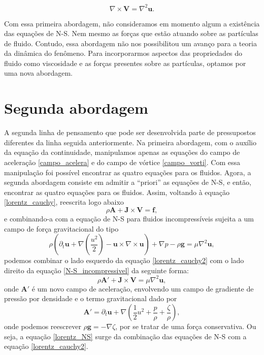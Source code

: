 \begin{equation}\label{amper-max_fluido2}
\nabla\times\textbf{V} = \nabla^{2}\textbf{u}.
\end{equation}

Com essa primeira abordagem, não consideramos em momento algum a existência das equações de N-S. Nem mesmo as forças que estão atuando sobre as partículas de fluido. Contudo, essa abordagem não nos possibilitou um avanço para a teoria da dinâmica do fenômeno. Para incorporarmos aspectos das propriedades do fluido como viscosidade e as forças presentes sobre as partículas, optamos por uma nova abordagem. 

\section{Segunda abordagem}
A segunda linha de pensamento que pode ser desenvolvida parte de pressupostos diferentes da linha seguida anteriormente. Na primeira abordagem, com o auxílio da equação da continuidade, manipulamos apenas as equações do campo de aceleração \ref{campo_acelera} e do campo de vórtice \ref{campo_vorti}. Com essa manipulação foi possível encontrar as quatro equações para os fluidos. Agora, a segunda abordagem consiste em admitir a “priori” as equações de N-S, e então, encontrar as quatro equações para os fluidos. Assim, voltando à equação \ref{lorentz_cauchy}, reescrita logo abaixo
\begin{equation}\label{lorentz_cauchy2}
    \rho \textbf{A} + \textbf{J} \times \textbf{V}= \textbf{f},
\end{equation}
e combinando-a com a equação de N-S para fluidos incompressíveis sujeita a um campo de força gravitacional do tipo
\begin{equation}\label{N-S_incompressivel}
    \rho \left(\partial_t\textbf{u} + \nabla(\frac{u^2}{2}) - \textbf{u}\times\nabla\times\textbf{u}\right) + \nabla p - \rho\textbf{g} = \mu\nabla^{2}\textbf{u},
\end{equation}
podemos combinar o lado esquerdo da equação \ref{lorentz_cauchy2} com o lado direito da equação \ref{N-S_incompressivel} da seguinte forma:
\begin{equation}\label{lorentz_NS}
    \rho \textbf{A}' + \textbf{J} \times \textbf{V}= \mu\nabla^{2}\textbf{u},
\end{equation}
onde $\textbf{A}'$ é um novo campo de aceleração, envolvendo um campo de gradiente de pressão por densidade e o termo gravitacional dado por
\begin{equation}\label{campo_acelera_NS}
    \textbf{A}' = \partial_{t}\textbf{u} + \nabla\left(\frac{1}{2}u^2 + \frac{p}{\rho} + \frac{\zeta}{\rho}\right),
\end{equation}
onde podemos reescrever $\rho\textbf{g} = -\nabla\zeta$, por se tratar de uma força conservativa. Ou seja, a equação \ref{lorentz_NS} surge da combinação das equações de N-S com a equação \ref{lorentz_cauchy2}.

